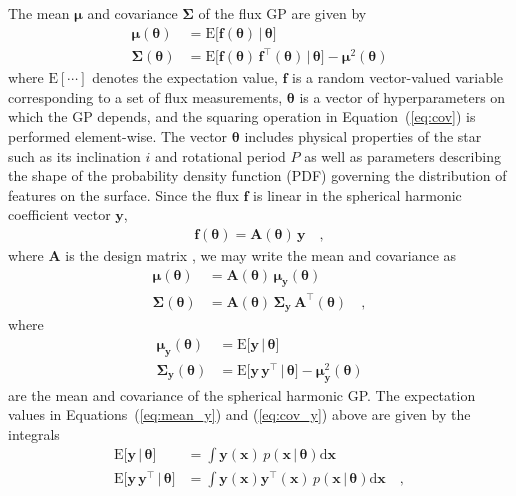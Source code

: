 \documentclass[modern]{aastex62}
\begin{document}
The mean $\pmb{\mu}$ and covariance $\pmb{\Sigma}$ of the flux GP are given by
%
\begin{align}
    \label{eq:mean}
    \pmb{\mu}(\pmb{\theta})
     & = \mathrm{E} \Big[ \mathbf{f}(\pmb{\theta}) \, \Big| \, \pmb{\theta} \Big]
    \\
    \label{eq:cov}
    \pmb{\Sigma}(\pmb{\theta})
     & = \mathrm{E} \Big[ \mathbf{f}(\pmb{\theta}) \, \mathbf{f}^\top(\pmb{\theta}) \, \Big| \, \pmb{\theta} \Big] - \pmb{\mu}^2(\pmb{\theta})
\end{align}
%
where $\mathrm{E}[\cdots]$ denotes the expectation value,
$\mathbf{f}$ is a random vector-valued variable corresponding to
a set of flux measurements, $\pmb{\theta}$ is a vector
of hyperparameters on which the GP depends, and the squaring operation in
Equation~(\ref{eq:cov}) is performed element-wise.
The vector $\pmb{\theta}$ includes physical properties of the star such
as its inclination $i$ and rotational period $P$ as well as parameters
describing the shape of the probability density function (PDF) governing
the distribution of features on the surface.
%
Since the flux
$\mathbf{f}$ is linear in
the spherical harmonic coefficient vector $\mathbf{y}$,
%
\begin{align}
    \label{eq:fAy}
    \mathbf{f}(\pmb{\theta}) = \mathbf{A}(\pmb{\theta}) \, \mathbf{y}
    \quad,
\end{align}
%
where $\mathbf{A}$ is the \starry design matrix \citep{Luger2019},
we may write the mean and covariance as
%
\begin{align}
    \pmb{\mu}(\pmb{\theta})
     & = \mathbf{A}(\pmb{\theta}) \, \pmb{\mu}_{\mathbf{y}}(\pmb{\theta})
    \\
    \pmb{\Sigma}(\pmb{\theta})
     & = \mathbf{A}(\pmb{\theta}) \, \pmb{\Sigma}_{\mathbf{y}} \, \mathbf{A}^\top(\pmb{\theta})
    \quad,
\end{align}
%
where
%
\begin{align}
    \label{eq:mean_y}
    \pmb{\mu}_{\mathbf{y}}(\pmb{\theta})
     & = \mathrm{E} \Big[ \mathbf{y} \, \Big| \, \pmb{\theta} \Big]
    \\
    \label{eq:cov_y}
    \pmb{\Sigma}_{\mathbf{y}}(\pmb{\theta})
     & = \mathrm{E} \Big[ \mathbf{y} \, \mathbf{y}^\top \, \Big| \, \pmb{\theta} \Big] - \pmb{\mu}_{\mathbf{y}}^2(\pmb{\theta})
\end{align}
%
are the mean and covariance of the spherical harmonic GP.
The expectation values in Equations~(\ref{eq:mean_y}) and (\ref{eq:cov_y})
above are given by the integrals
%
\begin{align}
    \label{eq:exp_y}
    \mathrm{E} \Big[ \mathbf{y} \, \Big| \, \pmb{\theta} \Big]
     & =
    \int \mathbf{y}(\mathbf{x} ) \, p(\mathbf{x} \, \big| \, \pmb{\theta})\mathrm{d}\mathbf{x}
    \\
    \label{eq:exp_yy}
    \mathrm{E} \Big[ \mathbf{y} \, \mathbf{y}^\top \, \Big| \, \pmb{\theta} \Big]
     & =
    \int \mathbf{y}(\mathbf{x} ) \mathbf{y}^\top(\mathbf{x} ) \, p(\mathbf{x} \, \big| \, \pmb{\theta})\mathrm{d}\mathbf{x}
    \quad,
\end{align}
\end{document}
